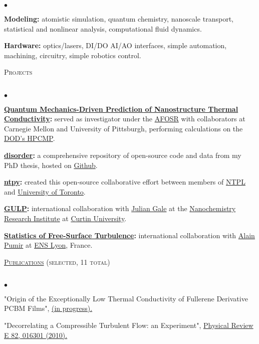 \documentclass{article}
\newcommand{\lineunder}{\vspace*{-8pt} \\ \hspace*{-18pt} \hrulefill \\}
\newcommand{\header}[1]{{\hspace*{-15pt}\vspace*{6pt} \textsc{#1}} \vspace*{-6pt} \lineunder}
\newenvironment{achievements}{\begin{list}{$\bullet$}{\topsep 0pt \itemsep -2pt}}{\vspace*{4pt}\end{list}}
\begin{document}
\begin{achievements}
\item \textbf{Modeling:} atomistic simulation, quantum chemistry, nanoscale transport, statistical and nonlinear analysis, computational fluid dynamics. 

\item \textbf{Hardware:} optics/lasers, DI/DO AI/AO interfaces, simple automation, machining, circuitry, simple robotics control.
\end{achievements}

\header{Projects}
\begin{achievements}
\item \textbf{\href{http://ntpl.me.cmu.edu/research.html}{Quantum Mechanics-Driven Prediction of Nanostructure Thermal Conductivity}:}
served as investigator under the 
\href{http://www.wpafb.af.mil/afrl/afosr/}{AFOSR} with collaborators at Carnegie Mellon and University of Pittsburgh, performing 
calculations on the \href{http://www.hpcmo.hpc.mil/cms2/index.php}{DOD's HPCMP}.

\item \textbf{\href{https://github.com/jasonlarkin/disorder}{disorder}:} a comprehensive repository of open-source code and data from my PhD thesis, hosted on \href{http://github.com/jasonlarkin}{Github}.

\item \textbf{\href{https://github.com/ntpl/ntpy}{ntpy}:} created this open-source  collaborative effort between members of \href{http://ntpl.me.cmu.edu/}{NTPL} and \href{http://www.mie.utoronto.ca/labs/atoms/}{University of Toronto}.

\item \textbf{\href{http://projects.ivec.org/gulp/}{GULP}:} international collaboration with \href{http://nanochemistry.curtin.edu.au/people/staff.cfm/J.Gale}{Julian Gale} at the 
\href{http://nanochemistry.curtin.edu.au/}{Nanochemistry Research Institute} at \href{http://www.curtin.edu.au/}{Curtin University}.

\item \textbf{\href{http://jasonlarkin.github.io/projects-ms.html}{Statistics of Free-Surface Turbulence}:} international collaboration with \href{http://perso.ens-lyon.fr/alain.pumir/Pumir_webpage.html}{Alain Pumir} at \href{http://www.ens-lyon.eu/annuaire/m-pumir-alain-83656.kjsp?RH=ZYZYZYZYZYZYZYZYZYZYZY}{ENS Lyon}, France.

\end{achievements}

\header{\href{http://jasonlarkin.github.io/pub.html}{Publications} (selected, 11 total)}
\begin{achievements}
\item "Origin of the Exceptionally Low Thermal Conductivity of Fullerene Derivative  PCBM Films", 
\href{http://jasonlarkin.github.io/projects-phd-pcbm.html}{(in progress).}
\item "Decorrelating a Compressible Turbulent Flow: an Experiment", \href{http://pre.aps.org/abstract/PRE/v82/i1/e016301}{Physical Review E 82, 016301 (2010).}
\end{achievements}
\end{document}
